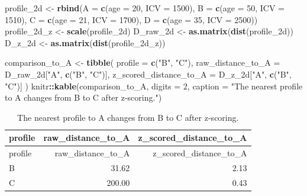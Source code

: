 \documentclass[
  english,
]{article}
\newenvironment{Shaded}{\begin{snugshade}}{\end{snugshade}}
\newcommand{\AttributeTok}[1]{\textcolor[rgb]{0.13,0.29,0.53}{#1}}
\newcommand{\DecValTok}[1]{\textcolor[rgb]{0.00,0.00,0.81}{#1}}
\newcommand{\FunctionTok}[1]{\textcolor[rgb]{0.13,0.29,0.53}{\textbf{#1}}}
\newcommand{\NormalTok}[1]{#1}
\newcommand{\OtherTok}[1]{\textcolor[rgb]{0.56,0.35,0.01}{#1}}
\newcommand{\SpecialCharTok}[1]{\textcolor[rgb]{0.81,0.36,0.00}{\textbf{#1}}}
\newcommand{\StringTok}[1]{\textcolor[rgb]{0.31,0.60,0.02}{#1}}
\begin{document}
\begin{Shaded}
\begin{Highlighting}[]
\NormalTok{profile\_2d }\OtherTok{\textless{}{-}} \FunctionTok{rbind}\NormalTok{(}\AttributeTok{A =} \FunctionTok{c}\NormalTok{(}\AttributeTok{age =} \DecValTok{20}\NormalTok{, }\AttributeTok{ICV =} \DecValTok{1500}\NormalTok{),}
                    \AttributeTok{B =} \FunctionTok{c}\NormalTok{(}\AttributeTok{age =} \DecValTok{50}\NormalTok{, }\AttributeTok{ICV =} \DecValTok{1510}\NormalTok{),}
                    \AttributeTok{C =} \FunctionTok{c}\NormalTok{(}\AttributeTok{age =} \DecValTok{21}\NormalTok{, }\AttributeTok{ICV =} \DecValTok{1700}\NormalTok{),}
                    \AttributeTok{D =} \FunctionTok{c}\NormalTok{(}\AttributeTok{age =} \DecValTok{35}\NormalTok{, }\AttributeTok{ICV =} \DecValTok{2500}\NormalTok{))}
\NormalTok{profile\_2d\_z }\OtherTok{\textless{}{-}} \FunctionTok{scale}\NormalTok{(profile\_2d)}
\NormalTok{D\_raw\_2d }\OtherTok{\textless{}{-}} \FunctionTok{as.matrix}\NormalTok{(}\FunctionTok{dist}\NormalTok{(profile\_2d))}
\NormalTok{D\_z\_2d }\OtherTok{\textless{}{-}} \FunctionTok{as.matrix}\NormalTok{(}\FunctionTok{dist}\NormalTok{(profile\_2d\_z))}

\NormalTok{comparison\_to\_A }\OtherTok{\textless{}{-}} \FunctionTok{tibble}\NormalTok{(}
  \AttributeTok{profile =} \FunctionTok{c}\NormalTok{(}\StringTok{"B"}\NormalTok{, }\StringTok{"C"}\NormalTok{),}
  \AttributeTok{raw\_distance\_to\_A =}\NormalTok{ D\_raw\_2d[}\StringTok{"A"}\NormalTok{, }\FunctionTok{c}\NormalTok{(}\StringTok{"B"}\NormalTok{, }\StringTok{"C"}\NormalTok{)],}
  \AttributeTok{z\_scored\_distance\_to\_A =}\NormalTok{ D\_z\_2d[}\StringTok{"A"}\NormalTok{, }\FunctionTok{c}\NormalTok{(}\StringTok{"B"}\NormalTok{, }\StringTok{"C"}\NormalTok{)]}
\NormalTok{)}
\NormalTok{knitr}\SpecialCharTok{::}\FunctionTok{kable}\NormalTok{(comparison\_to\_A, }\AttributeTok{digits =} \DecValTok{2}\NormalTok{,}
             \AttributeTok{caption =} \StringTok{"The nearest profile to A changes from B to C after z{-}scoring."}\NormalTok{)}
\end{Highlighting}
\end{Shaded}

\begin{longtable}[]{@{}lrr@{}}
\caption{The nearest profile to A changes from B to C after
z-scoring.}\tabularnewline
\toprule\noalign{}
profile & raw\_distance\_to\_A & z\_scored\_distance\_to\_A \\
\midrule\noalign{}
\endfirsthead
\toprule\noalign{}
profile & raw\_distance\_to\_A & z\_scored\_distance\_to\_A \\
\midrule\noalign{}
\endhead
\bottomrule\noalign{}
\endlastfoot
B & 31.62 & 2.13 \\
C & 200.00 & 0.43 \\
\end{longtable}
\end{document}
